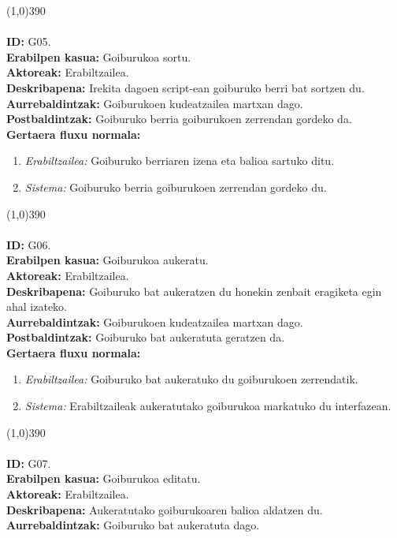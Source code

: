 \line(1,0){390}\\
\noindent\\
\textbf{ID:} G05.\\
\textbf{Erabilpen kasua:} Goiburukoa sortu.\\
\textbf{Aktoreak:} Erabiltzailea.\\
\textbf{Deskribapena:} Irekita dagoen script-ean goiburuko berri bat sortzen du.\\
\textbf{Aurrebaldintzak:} Goiburukoen kudeatzailea martxan dago.\\
\textbf{Postbaldintzak:} Goiburuko berria goiburukoen zerrendan gordeko da.\\
\textbf{Gertaera fluxu normala:}
\begin{enumerate}
	\item \textit{Erabiltzailea:} Goiburuko berriaren izena eta balioa sartuko ditu.
	\item \textit{Sistema:} Goiburuko berria goiburukoen zerrendan gordeko du.
\end{enumerate}
\line(1,0){390}\\
\noindent\\
\textbf{ID:} G06.\\
\textbf{Erabilpen kasua:} Goiburukoa aukeratu.\\
\textbf{Aktoreak:} Erabiltzailea.\\
\textbf{Deskribapena:} Goiburuko bat aukeratzen du honekin zenbait eragiketa egin ahal izateko.\\
\textbf{Aurrebaldintzak:} Goiburukoen kudeatzailea martxan dago.\\
\textbf{Postbaldintzak:} Goiburuko bat aukeratuta geratzen da.\\
\textbf{Gertaera fluxu normala:}
\begin{enumerate}
	\item \textit{Erabiltzailea:} Goiburuko bat aukeratuko du goiburukoen zerrendatik.
	\item \textit{Sistema:} Erabiltzaileak aukeratutako goiburukoa markatuko du interfazean.
\end{enumerate}
\line(1,0){390}\\
\noindent\\
\textbf{ID:} G07.\\
\textbf{Erabilpen kasua:} Goiburukoa editatu.\\
\textbf{Aktoreak:} Erabiltzailea.\\
\textbf{Deskribapena:} Aukeratutako goiburukoaren balioa aldatzen du.\\
\textbf{Aurrebaldintzak:} Goiburuko bat aukeratuta dago.\\
